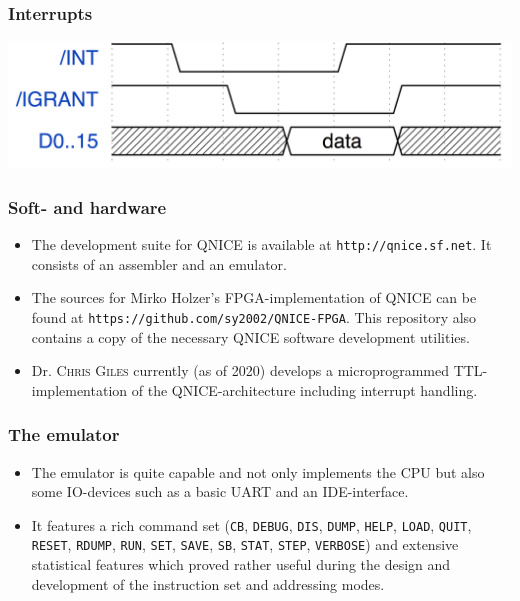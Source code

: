 \documentclass{beamer}
\begin{document}
%
  \begin{frame}
   \frametitle{Interrupts}
   \begin{center}
    \includegraphics[width=.8\textwidth]{interrupt_timing.jpg}
   \end{center}
%  
%  
  \end{frame}
%
  \begin{frame}
   \frametitle{Soft- and hardware}
   \begin{itemize}
    \item The development suite for QNICE is available at 
     \texttt{http://qnice.sf.net}. It consists of an assembler and
     an emulator.
    \item The sources for Mirko Holzer's FPGA-implementation of
     QNICE can be found at \texttt{https://github.com/sy2002/QNICE-FPGA}.
     This repository also contains a copy of the necessary QNICE 
     software development utilities.
    \item Dr. \textsc{Chris Giles} currently (as of 2020) develops a
     microprogrammed TTL-implementation of the QNICE-architecture including
     interrupt handling.
   \end{itemize}
  \end{frame}
%
  \begin{frame}
   \frametitle{The emulator}
   \begin{itemize}
    \item The emulator is quite capable and not only implements
     the CPU but also some IO-devices such as a basic UART and
     an IDE-interface.
    \item It features a rich command set (\texttt{CB}, {\tt DEBUG}, {\tt DIS},
     {\tt DUMP}, {\tt HELP}, {\tt LOAD}, {\tt QUIT}, {\tt RESET}, {\tt RDUMP},
     {\tt RUN}, {\tt SET}, {\tt SAVE}, \texttt{SB}, {\tt STAT}, {\tt STEP}, 
     {\tt VERBOSE})
     and extensive statistical
     features which proved rather useful during the design and development
     of the instruction set and addressing modes.
   \end{itemize}
  \end{frame}
\end{document}
